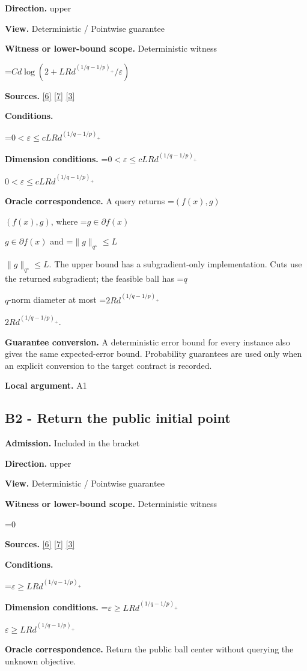 \documentclass[10pt,a4paper]{article}
\newcommand{\AtlasMath}[1]{\par\begingroup\centering\setbox0=\hbox{$\displaystyle #1$}\ifdim\wd0>1.4\linewidth\typeout{ATLAS WIDE FORMULA: \the\wd0}\fi\ifdim\wd0>\linewidth\resizebox{\linewidth}{!}{\box0}\else\box0\fi\par\endgroup}
\newcommand{\AtlasInlineMath}[1]{\begingroup\setbox0=\hbox{$#1$}\ifdim\wd0>.4\linewidth\endgroup\AtlasMath{#1}\else\endgroup$#1$\fi}
\begin{document}
\textbf{Direction.} upper

\textbf{View.} Deterministic / Pointwise guarantee

\textbf{Witness or lower-bound scope.} Deterministic witness

\AtlasMath{C d\log(2+LRd^{(1/q-1/p)_+}/\varepsilon)}
\textbf{Sources.} \href{https://arxiv.org/pdf/1405.4980}{[6]} \href{https://www2.isye.gatech.edu/~nemirovs/MOR_AccuracyCertificates.pdf}{[7]} \href{https://arxiv.org/pdf/2609.20701}{[3]}

\textbf{Conditions.} 
\AtlasMath{0<\varepsilon\le c LRd^{(1/q-1/p)_+}}


\textbf{Dimension conditions.} \AtlasInlineMath{0<\varepsilon\le c LRd^{(1/q-1/p)_+}}

\textbf{Oracle correspondence.} A query returns \AtlasInlineMath{(f(x),g)}, where \AtlasInlineMath{g\in\partial f(x)} and \AtlasInlineMath{\|g\|_{q^\star}\le L}. The upper bound has a subgradient-only implementation. Cuts use the returned subgradient; the feasible ball has \AtlasInlineMath{q}-norm diameter at most \AtlasInlineMath{2Rd^{(1/q-1/p)_+}}.

\textbf{Guarantee conversion.} A deterministic error bound for every instance also gives the same expected-error bound. Probability guarantees are used only when an explicit conversion to the target contract is recorded.

\textbf{Local argument.} A1

\subsection{B2 - Return the public initial point}
\textbf{Admission.} Included in the bracket

\textbf{Direction.} upper

\textbf{View.} Deterministic / Pointwise guarantee

\textbf{Witness or lower-bound scope.} Deterministic witness

\AtlasMath{0}
\textbf{Sources.} \href{https://arxiv.org/pdf/1405.4980}{[6]} \href{https://www2.isye.gatech.edu/~nemirovs/MOR_AccuracyCertificates.pdf}{[7]} \href{https://arxiv.org/pdf/2609.20701}{[3]}

\textbf{Conditions.} 
\AtlasMath{\varepsilon\ge LRd^{(1/q-1/p)_+}}


\textbf{Dimension conditions.} \AtlasInlineMath{\varepsilon\ge LRd^{(1/q-1/p)_+}}

\textbf{Oracle correspondence.} Return the public ball center without querying the unknown objective.
\end{document}
